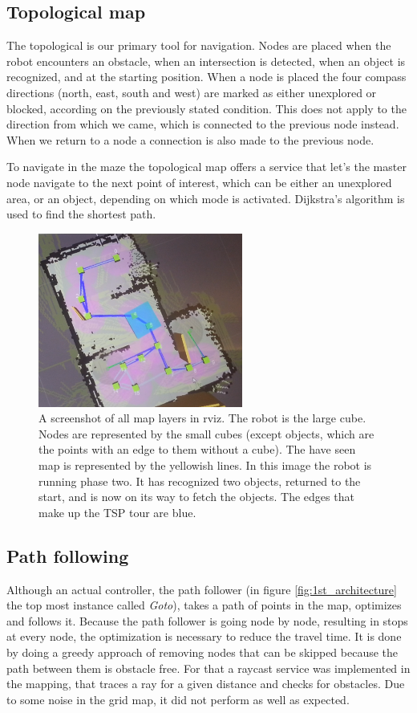 \subsection{Topological map}
The topological is our primary tool for navigation. Nodes are placed when the robot encounters an obstacle, when an intersection is detected, when an object is recognized, and at the starting position. When a node is placed the four compass directions (north, east, south and west) are marked as either unexplored or blocked, according on the previously stated condition. This does not apply to the direction from which we came, which is connected to the previous node instead. When we return to a node a connection is also made to the previous node.

To navigate in the maze the topological map offers a service that let's the master node navigate to the next point of interest, which can be either an unexplored area, or an object, depending on which mode is activated. Dijkstra's algorithm is used to find the shortest path.

\begin{figure}[h]
\begin{center}
\includegraphics[width=0.6\textwidth]{figures/map.png}
\end{center}
\caption{A screenshot of all map layers in rviz. The robot is the large cube. Nodes are represented by the small cubes (except objects, which are the points with an edge to them without a cube). The have seen map is represented by the yellowish lines. In this image the robot is running phase two. It has recognized two objects, returned to the start, and is now on its way to fetch the objects. The edges that make up the TSP tour are blue.}
\label{fig:arch_controller}
\end{figure}

\subsection{Path following}
Although an actual controller, the path follower (in figure \ref{fig:1st_architecture} the top most instance called \textit{Goto}),
takes a path of points in the map, optimizes and follows it.
Because the path follower is going node by node, resulting in stops at every node, the optimization is necessary to reduce the travel time.
It is done by doing a greedy approach of removing nodes that can be skipped because the path between them is obstacle free.
For that a raycast service was implemented in the mapping, that traces a ray for a given distance and checks for obstacles.
Due to some noise in the grid map, it did not perform as well as expected.